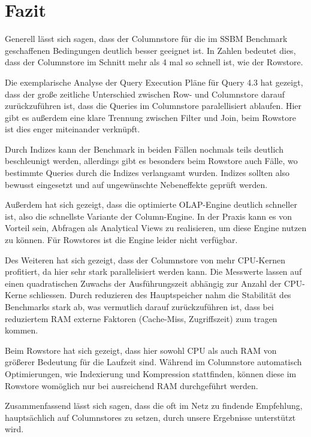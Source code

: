 \chapter{Fazit}\label{chapter:fazit}
Generell lässt sich sagen, dass der Columnstore für die im SSBM Benchmark
geschaffenen Bedingungen deutlich besser geeignet ist.
In Zahlen bedeutet dies, dass der Columnstore im Schnitt mehr als 4 mal so schnell ist,
wie der Rowstore.

Die exemplarische Analyse der Query Execution Pläne für Query 4.3 hat gezeigt,
dass der große zeitliche Unterschied zwischen Row- und 
Columnstore darauf zurückzuführen ist, dass die Queries im Columnstore paralellisiert ablaufen.
Hier gibt es außerdem eine klare Trennung zwischen Filter und Join,
beim Rowstore ist dies enger miteinander verknüpft. 


Durch Indizes kann der Benchmark in beiden Fällen nochmals teils deutlich beschleunigt werden,
allerdings gibt es besonders beim Rowstore auch Fälle,
wo bestimmte Queries durch die Indizes verlangsamt wurden.
Indizes sollten also bewusst eingesetzt und auf ungewünschte Nebeneffekte geprüft werden.

Außerdem hat sich gezeigt, dass die optimierte OLAP-Engine deutlich schneller ist,
also die schnellste Variante der Column-Engine.
In der Praxis kann es von Vorteil sein, Abfragen als Analytical Views zu realisieren,
um diese Engine nutzen zu können. Für Rowstores ist die Engine leider nicht verfügbar.

Des Weiteren hat sich gezeigt, dass der Columnstore von mehr CPU-Kernen profitiert,
da hier sehr stark parallelisiert werden kann. 
Die Messwerte lassen auf einen quadratischen Zuwachs der Ausführungszeit
abhängig zur Anzahl der CPU-Kerne schliessen.
Durch reduzieren des Hauptspeicher nahm die Stabilität des Benchmarks stark ab,
was vermutlich darauf zurückzuführen ist, dass bei reduziertem RAM
externe Faktoren (Cache-Miss, Zugriffszeit) zum tragen kommen. 

Beim Rowstore hat sich gezeigt, dass hier sowohl CPU als auch RAM von größerer
Bedeutung für die Laufzeit sind. 
Während im Columnstore automatisch Optimierungen, wie Indexierung und Kompression stattfinden,
können diese im Rowstore womöglich nur bei ausreichend RAM durchgeführt werden. 

Zusammenfassend lässt sich sagen, dass die oft im Netz zu findende Empfehlung,
hauptsächlich auf Columnstores zu setzen, durch unsere Ergebnisse unterstützt wird.
